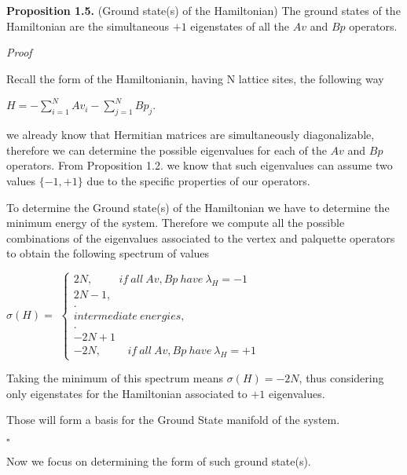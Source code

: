 \documentclass[12pt]{report}
\begin{document}
	
	\begin{minipage}{1\textwidth}
		
		\textbf{Proposition 1.5.} (Ground state(s) of the Hamiltonian) The ground states of the Hamiltonian are the simultaneous $+1$ eigenstates of all the $Av$ and $Bp$ operators. \newline
		
		\textit{Proof}\newline 
		
		Recall the form of the Hamiltonianin, having N lattice sites, the following way \newline
		
		\begin{center}
			
			$H = -\sum_{i=1}^{N}
			Av_i - \sum_{j=1}^{N} Bp_j $.\newline
			
		\end{center}
		
		we already know that Hermitian matrices are simultaneously diagonalizable, therefore we can determine the possible eigenvalues for each of the $Av$ and $Bp$ operators. From Proposition 1.2. we know that such eigenvalues can assume two values $\{-1,+1\}$ due to the specific properties of our operators.\newline
		
		To determine the Ground state(s) of the Hamiltonian we have to determine the minimum energy of the system. Therefore we compute all the possible combinations of the eigenvalues associated to the vertex and palquette operators to obtain the following spectrum of values\newline
		
		\begin{center}
		$\sigma( H) =$
		$\begin{cases}
			2N, \hspace{1cm} if \ all\ Av,Bp \ have \ \lambda_{H}= -1\\
			2N-1,\\
			.\\
			intermediate \ energies,\\
			.\\
			-2N+1\\
			-2N, \hspace{1cm} if \ all \ Av,Bp \ have \ \lambda_{H}= +1
		\end{cases}$
		\newline
     	\end{center}
		
		Taking the minimum of this spectrum means $\sigma(H)=-2N$, thus considering only eigenstates for the Hamiltonian associated to $+1$ eigenvalues.\newline
		
		Those will form a basis for the Ground State manifold of the system.\newline
		
		\hfill $\square$\newline
		
		
		Now we focus on determining the form of such ground state(s).\newline
		
	\end{minipage}
	
\end{document}
